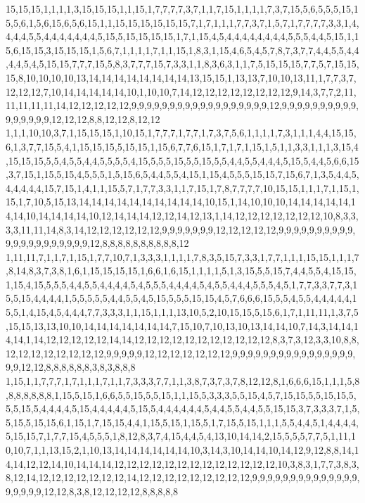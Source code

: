 15,15,15,1,1,1,1,3,15,15,15,1,1,15,1,7,7,7,7,3,7,1,1,7,15,1,1,1,1,7,3,7,15,5,6,5,5,5,15,15,5,6,1,5,6,15,6,5,6,15,1,1,15,15,15,15,15,15,7,1,7,1,1,1,7,7,3,7,1,5,7,1,7,7,7,7,3,3,1,4,4,4,4,5,5,4,4,4,4,4,4,4,5,15,5,15,15,15,15,1,7,1,15,4,5,4,4,4,4,4,4,4,4,5,5,5,4,4,5,15,1,15,6,15,15,3,15,15,15,1,5,6,7,1,1,1,1,7,1,1,15,1,8,3,1,15,4,6,5,4,5,7,8,7,3,7,7,4,4,5,5,4,4,4,4,5,4,5,15,15,7,7,7,15,5,8,3,7,7,7,15,7,3,3,1,1,8,3,6,3,1,1,7,5,15,15,15,7,7,5,7,15,15,15,8,10,10,10,10,13,14,14,14,14,14,14,14,14,13,15,15,1,13,13,7,10,10,13,11,1,7,7,3,7,12,12,12,7,10,14,14,14,14,14,10,1,10,10,7,14,12,12,12,12,12,12,12,12,9,14,3,7,7,2,11,11,11,11,11,14,12,12,12,12,12,9,9,9,9,9,9,9,9,9,9,9,9,9,9,9,9,9,9,12,9,9,9,9,9,9,9,9,9,9,9,9,9,9,9,9,12,12,12,8,8,12,12,8,12,12
1,1,1,10,10,3,7,1,15,15,15,1,10,15,1,7,7,7,1,7,7,1,7,3,7,5,6,1,1,1,1,7,3,1,1,1,4,4,15,15,6,1,3,7,7,15,5,4,1,15,15,15,5,15,15,1,15,6,7,7,6,15,1,7,1,7,1,15,1,5,1,1,3,3,1,1,1,3,15,4,15,15,15,5,5,4,5,5,4,4,5,5,5,5,4,15,5,5,5,15,5,5,15,5,5,4,4,5,5,4,4,4,5,15,5,4,4,5,6,6,15,3,7,15,1,15,5,15,4,5,5,5,1,5,15,6,5,4,4,5,5,4,15,1,15,4,5,5,5,15,15,7,15,6,7,1,3,5,4,4,5,4,4,4,4,4,15,7,15,1,4,1,1,15,5,7,1,7,7,3,3,1,1,7,15,1,7,8,7,7,7,7,10,15,15,1,1,1,7,1,15,1,15,1,7,10,5,15,13,14,14,14,14,14,14,14,14,14,14,10,15,1,14,10,10,10,14,14,14,14,14,14,14,10,14,14,14,14,10,12,14,14,14,12,12,14,12,13,1,14,12,12,12,12,12,12,12,10,8,3,3,3,3,11,11,14,8,3,14,12,12,12,12,12,12,9,9,9,9,9,9,9,12,12,12,12,12,9,9,9,9,9,9,9,9,9,9,9,9,9,9,9,9,9,9,9,9,9,12,8,8,8,8,8,8,8,8,8,8,12
1,11,11,7,1,1,7,1,15,1,7,7,10,7,1,3,3,3,1,1,1,1,7,8,3,5,15,7,3,3,1,7,7,1,1,1,15,15,1,1,1,7,8,14,8,3,7,3,8,1,6,1,15,15,15,15,1,6,6,1,6,15,1,1,1,1,5,1,3,15,5,5,15,7,4,4,5,5,4,15,15,1,15,4,15,5,5,5,4,4,5,5,4,4,4,4,5,4,5,5,5,4,4,4,4,5,4,5,5,4,4,4,5,5,5,4,5,1,7,7,3,3,7,7,3,15,5,15,4,4,4,4,1,5,5,5,5,5,4,4,5,5,4,5,15,5,5,5,15,15,4,5,7,6,6,6,15,5,5,4,5,5,4,4,4,4,4,15,5,1,4,15,4,5,4,4,4,7,7,3,3,3,1,1,15,1,1,1,13,10,5,2,10,15,15,5,15,6,1,7,1,11,11,1,3,7,5,15,15,13,13,10,10,14,14,14,14,14,14,14,7,15,10,7,10,13,10,13,14,14,10,7,14,3,14,14,14,14,1,14,12,12,12,12,12,14,14,12,12,12,12,12,12,12,12,12,12,12,8,3,7,3,12,3,3,10,8,8,12,12,12,12,12,12,12,12,9,9,9,9,9,12,12,12,12,12,12,12,9,9,9,9,9,9,9,9,9,9,9,9,9,9,9,9,9,9,12,12,8,8,8,8,8,8,3,8,3,8,8,8
1,15,1,1,7,7,7,1,7,1,1,1,7,1,1,7,3,3,3,7,7,1,1,3,8,7,3,7,3,7,8,12,12,8,1,6,6,6,15,1,1,1,5,8,8,8,8,8,8,8,1,15,5,15,1,6,6,5,5,15,5,5,15,1,1,15,5,3,3,3,5,5,15,4,5,7,15,15,5,5,15,15,5,5,5,15,5,4,4,4,4,5,15,4,4,4,4,4,5,15,5,4,4,4,4,4,4,5,4,4,5,5,4,4,5,5,15,15,3,7,3,3,3,7,1,5,5,15,5,15,15,6,1,15,1,7,15,15,4,4,1,15,5,15,1,15,5,1,7,15,5,15,1,1,1,5,5,4,4,5,1,4,4,4,4,5,15,15,7,1,7,7,15,4,5,5,5,1,8,12,8,3,7,4,15,4,4,5,4,13,10,14,14,2,15,5,5,5,7,7,5,1,11,10,10,7,1,1,13,15,2,1,10,13,14,14,14,14,14,14,10,3,14,3,10,14,14,10,14,12,9,12,8,8,14,14,14,12,12,14,10,14,14,14,12,12,12,12,12,12,12,12,12,12,12,12,12,10,3,8,3,1,7,7,3,8,3,8,12,14,12,12,12,12,12,12,12,14,12,12,12,12,12,12,12,12,12,9,9,9,9,9,9,9,9,9,9,9,9,9,9,9,9,9,9,9,12,12,8,3,8,12,12,12,12,8,8,8,8,8
